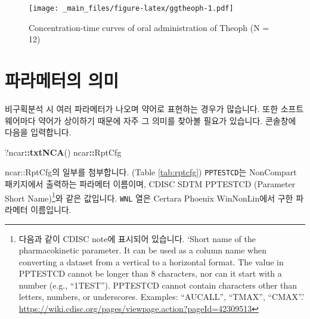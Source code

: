 \documentclass[12pt,]{krantz}
\newenvironment{Shaded}{\begin{snugshade}}{\end{snugshade}}
\newcommand{\KeywordTok}[1]{\textcolor[rgb]{0.13,0.29,0.53}{\textbf{#1}}}
\newcommand{\OperatorTok}[1]{\textcolor[rgb]{0.81,0.36,0.00}{\textbf{#1}}}
\newcommand{\NormalTok}[1]{#1}
\let\rmarkdownfootnote\footnote%
\def\footnote{\protect\rmarkdownfootnote}
\begin{document}
\begin{figure}
\centering
\texttt{[image: \_main\_files/figure-latex/ggtheoph-1.pdf]}
\caption{\label{fig:ggtheoph}Concentration-time curves of oral
administration of Theoph (N = 12)}
\end{figure}

\section{파라메터의 의미}\label{-}

비구획분석 시 여러 파라메터가 나오며 약어로 표현하는 경우가 많습니다.
또한 소프트웨어마다 약어가 상이하기 때문에 자주 그 의미를 찾아볼 필요가
있습니다. 콘솔창에 다음을 입력합니다.

\begin{Shaded}
\begin{Highlighting}[]
\NormalTok{?ncar}\OperatorTok{::}\KeywordTok{txtNCA}\NormalTok{()}
\NormalTok{ncar}\OperatorTok{::}\NormalTok{RptCfg}
\end{Highlighting}
\end{Shaded}

ncar::RptCfg의 일부를 첨부합니다. (Table \ref{tab:rptcfg})
\texttt{PPTESTCD}는 NonCompart 패키지에서 출력하는 파라메터 이름이며,
CDISC SDTM PPTESTCD (Parameter Short Name)\footnote{다음과 같이 CDISC
  note에 표시되어 있습니다. `Short name of the pharmacokinetic
  parameter. It can be used as a column name when converting a dataset
  from a vertical to a horizontal format. The value in PPTESTCD cannot
  be longer than 8 characters, nor can it start with a number (e.g.,
  ``1TEST''). PPTESTCD cannot contain characters other than letters,
  numbers, or underscores. Examples: ``AUCALL'', ``TMAX'', ``CMAX''.'
  \url{https://wiki.cdisc.org/pages/viewpage.action?pageId=42309513}}와
같은 값입니다. \texttt{WNL} 열은 Certara Phoenix WinNonLin에서 구한
파라메터 이름입니다.
\end{document}
